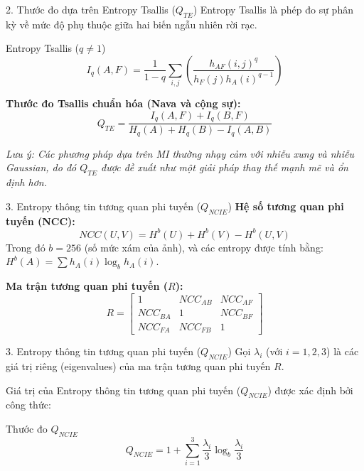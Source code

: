 \documentclass{beamer}
\begin{document}
\begin{frame}{2. Thước đo dựa trên Entropy Tsallis ($Q_{TE}$)}
    Entropy Tsallis là phép đo sự phân kỳ về mức độ phụ thuộc giữa hai biến ngẫu nhiên rời rạc.

    \begin{block}{Entropy Tsallis ($q \neq 1$)}
    \begin{equation}
        I_q(A,F) = \frac{1}{1-q} \sum_{i,j} \left( \frac{h_{AF}(i,j)^q}{h_F(j)h_A(i)^{q-1}} \right)
    \end{equation}
    \end{block}

    \textbf{Thước đo Tsallis chuẩn hóa (Nava và cộng sự):}
    \begin{equation}
        Q_{TE} = \frac{I_q(A,F) + I_q(B,F)}{H_q(A) + H_q(B) - I_q(A,B)}
    \end{equation}

    \vspace{0.2cm}
    \footnotesize{\textit{Lưu ý: Các phương pháp dựa trên MI thường nhạy cảm với nhiễu xung và nhiễu Gaussian, do đó $Q_{TE}$ được đề xuất như một giải pháp thay thế mạnh mẽ và ổn định hơn.}}
\end{frame}

\begin{frame}{3. Entropy thông tin tương quan phi tuyến ($Q_{NCIE}$)}
    \textbf{Hệ số tương quan phi tuyến (NCC):}
    \begin{equation}
        NCC(U,V) = H^b(U) + H^b(V) - H^b(U,V)
    \end{equation}
    Trong đó $b=256$ (số mức xám của ảnh), và các entropy được tính bằng:
    $H^b(A) = \sum h_A(i)\log_b h_A(i)$.

    \vspace{0.3cm}
    \textbf{Ma trận tương quan phi tuyến ($R$):}
    \begin{equation}
        R = \begin{bmatrix}
            1 & NCC_{AB} & NCC_{AF} \\
            NCC_{BA} & 1 & NCC_{BF} \\
            NCC_{FA} & NCC_{FB} & 1
        \end{bmatrix}
    \end{equation}
\end{frame}

\begin{frame}{3. Entropy thông tin tương quan phi tuyến ($Q_{NCIE}$)}
    Gọi $\lambda_i$ (với $i=1, 2, 3$) là các giá trị riêng (eigenvalues) của ma trận tương quan phi tuyến $R$.

    \vspace{0.5cm}
    Giá trị của Entropy thông tin tương quan phi tuyến ($Q_{NCIE}$) được xác định bởi công thức:

    \begin{block}{Thước đo $Q_{NCIE}$}
    \begin{equation}
        Q_{NCIE} = 1 + \sum_{i=1}^3 \frac{\lambda_i}{3} \log_b \frac{\lambda_i}{3}
    \end{equation}
    \end{block}
\end{frame}
\end{document}
